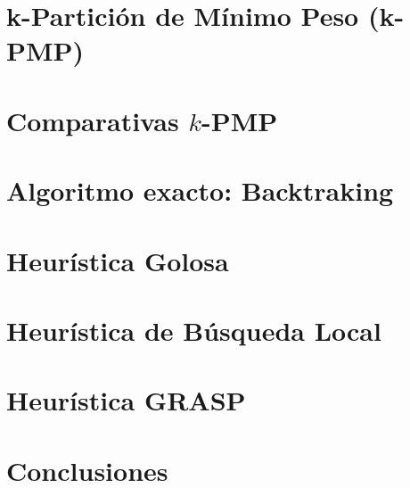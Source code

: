 \documentclass[11pt,a4paper]{article}
\begin{document}
\thispagestyle{empty}
\maketitle
\tableofcontents

\newpage
\section{k-Partici\'on de M\'inimo Peso (k-PMP)}


\newpage
\section{Comparativas $k$-PMP}


\newpage
\section{Algoritmo exacto: Backtraking}


\newpage
\section{Heur\'istica Golosa}


\newpage
\section{Heur\'istica de B\'usqueda Local}


\newpage
\section{Heur\'istica GRASP}


\newpage
\section{Conclusiones}


\newpage
\begin{thebibliography}{2}

 

  
\end{thebibliography}
\end{document}
